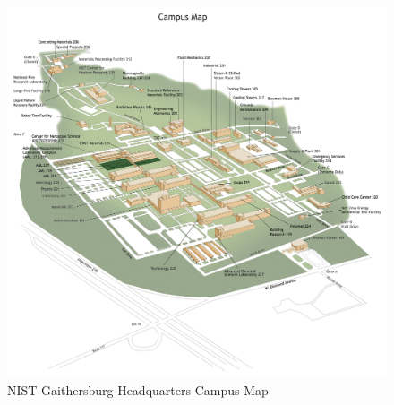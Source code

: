 \begin{figure}[ht]
  \centering
  \includegraphics[scale=0.70]{figures/nist-gaithersburg-campus-map}
  \caption{NIST Gaithersburg Headquarters Campus Map}
  \label{fig:nist-gaithersburg-campus-map}
\end{figure}

\clearpage